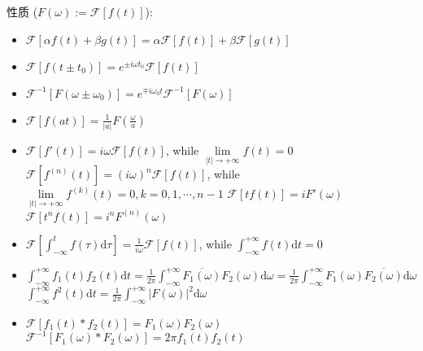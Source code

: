 \documentclass[UTF8, 12pt]{ctexart}
\begin{document}
	性质 ($ F(\omega) := \mathscr{F}[f(t)] $): 
	\begin{itemize}[leftmargin = 4em]
		\item $ \mathscr{F}[\alpha f(t) + \beta g(t)] = \alpha\mathscr{F}[f(t)] + \beta\mathscr{F}[g(t)] $
		\item $ \mathscr{F}[f(t \pm t_0)] = e^{\pm i\omega t_0}\mathscr{F}[f(t)] $
		\item $ \mathscr{F}^{-1}[F(\omega \pm \omega_0)] = e^{\mp i\omega_0 t}\mathscr{F}^{-1}[F(\omega)] $
		\item $ \mathscr{F}[f(at)] = \frac{1}{|a|} F(\frac{\omega}{a})$
		\item $ \mathscr{F}[f'(t)] = i\omega\mathscr{F}[f(t)] $, while $ \lim\limits_{|t| \to +\infty}f(t) = 0 $ \newline
				$ \mathscr{F}[f^{(n)}(t)] = (i\omega)^{n}\mathscr{F}[f(t)] $, while $ \lim\limits_{|t| \to +\infty}f^{(k)}(t) = 0 , k = 0, 1, \cdots, n-1 $ \newline
				$ \mathscr{F}[tf(t)] = iF'(\omega) $ \newline
				$ \mathscr{F}[t^{n}f(t)] = i^{n}F^{(n)}(\omega) $
		\item $ \mathscr{F}[\int_{-\infty}^{t}f(\tau)\mathrm{d}\tau] = \frac{1}{i\omega}\mathscr{F}[f(t)] $, while $ \int_{-\infty}^{+\infty}f(t)\mathrm{d}t = 0 $
		\item $ \int_{-\infty}^{+\infty}f_1(t)f_2(t)\mathrm{d}t = \frac{1}{2\pi}\int_{-\infty}^{+\infty}\overline{F_1(\omega)}F_2(\omega)\mathrm{d}\omega =  \frac{1}{2\pi}\int_{-\infty}^{+\infty}F_1(\omega)\overline{F_2(\omega)}\mathrm{d}\omega $ \newline
				$ \int_{-\infty}^{+\infty}f^{2}(t)\mathrm{d}t = \frac{1}{2\pi}\int_{-\infty}^{+\infty}|F(\omega)|^{2}\mathrm{d}\omega $
		\item $ \mathscr{F}[f_1(t) * f_2(t)] = F_1(\omega)F_2(\omega) $ \newline
				$ \mathscr{F}^{-1}[F_1(\omega) * F_2(\omega)] = 2\pi f_1(t)f_2(t) $
	\end{itemize}
 
\end{document}
